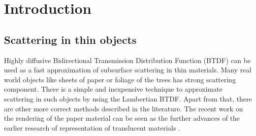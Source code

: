 \chapter{Introduction}
\label{chapter:introduction}









\section{Scattering in thin objects}
Highly diffusive Bidirectional Transmission Distribution Function (BTDF) can be used as a fast
approximation of subsurface scattering in thin materials. Many real world objects like sheets of
paper or foliage of the trees has strong scattering component. There is a simple and inexpensive
technique to approximate scattering in such objects by using the Lambertian BTDF. Apart from that,
there are other more correct methods described in the literature. The recent work on the rendering
of the paper material \cite{DBLP:journals/cgf/PapasMJ14} can be seen as the further advances of the
earlier research of representation of translucent materials \cite{Donner:2005:LDM:1186822.1073308}.
